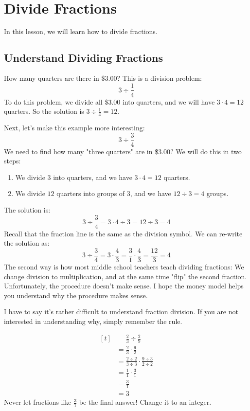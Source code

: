 
\section{Divide Fractions}
\thispagestyle{fancy}

In this lesson, we will learn how to divide fractions.

\subsection{Understand Dividing Fractions}

How many quarters are there in \$$3.00$? This is a division problem:
\[ 3\div\frac{1}{4} \]
To do this problem, we divide all \$$3.00$ into quarters, and we will have $3\cdot4=12$ quarters. So the solution is $3\div\frac{1}{4}=12$.

Next, let's make this example more interesting:
\[ 3\div\frac{3}{4} \]
We need to find how many "three quarters" are in \$$3.00$? We will do this in two steps:
\begin{enumerate}
\item We divide $3$ into quarters, and we have $3\cdot4=12$ quarters.
\item We divide $12$ quarters into groups of $3$, and we have $12\div3=4$ groups.
\end{enumerate}
The solution is:
\[ 3\div\frac{3}{4}=3\cdot4\div3=12\div3=4 \]
Recall that the fraction line is the same as the division symbol. We can re-write the solution as:
\[ 3\div\frac{3}{4}=3\cdot\frac{4}{3}=\frac{3}{1}\cdot\frac{4}{3}=\frac{12}{3}=4 \]
The second way is how most middle school teachers teach dividing fractions: We change division to multiplication, and at the same time "flip" the second fraction. Unfortunately, the procedure doesn't make sense. I hope the money model helps you understand why the procedure makes sense.

I have to say it's rather difficult to understand fraction division. If you are not interested in understanding why, simply remember the rule.

\begin{myexample}
\[ 
\begin{aligned}[t]
	&\phantom{{}=}\frac{2}{3} \div \frac{2}{9} \\
	&= \frac{2}{3} \cdot \frac{9}{2} \\
	&= \frac{2\div2}{3\div3} \cdot \frac{9\div3}{2\div2} \\
	&= \frac{1}{1} \cdot \frac{3}{1} \\
	&= \frac{3}{1} \\
	&= 3
\end{aligned}
\]
Never let fractions like $\frac{3}{1}$ be the final answer! Change it to an integer.
\end{myexample}

